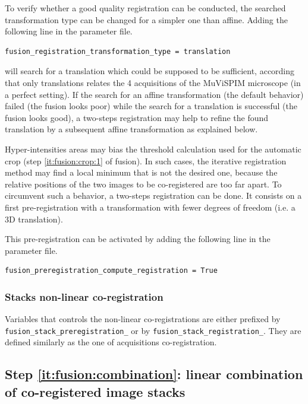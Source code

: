 To verify whether a good quality registration can be conducted, the searched transformation type can be changed for a simpler one than affine. 
Adding the following line in the parameter file.
\begin{verbatim}
fusion_registration_transformation_type = translation
\end{verbatim}
will search for a translation which could be supposed to be sufficient, according that only translations relates the 4 acquisitions of the MuViSPIM microscope (in a perfect setting). If the search for an affine transformation (the default behavior) failed (the fusion looks poor) while the search for a translation is successful (the fusion looks good), a two-steps registration may help to refine the found translation by a subsequent affine transformation as explained below.

Hyper-intensities areas may bias the threshold calculation used for the automatic crop (step \ref{it:fusion:crop:1} of fusion). In such cases, the iterative registration method may find a local minimum that is not the desired one, because the relative positions of the two images to be co-registered are too far apart. To circumvent such a behavior, a two-steps registration can be done. It consists on a first pre-registration with a transformation with fewer degrees of freedom (i.e. a 3D translation). 

This pre-registration can be activated by adding the following line in the parameter file.
\begin{verbatim}
fusion_preregistration_compute_registration = True
\end{verbatim}

\subsubsection{Stacks non-linear co-registration}
\label{sec:cli:fuse:stack:registration}
Variables that controls the non-linear co-registrations are either prefixed by \texttt{fusion\_stack\_preregistration\_} or by \texttt{fusion\_stack\_registration\_}. They are defined similarly as the one of acquisitions co-registration. 






\subsection{Step \ref{it:fusion:combination}: linear combination of co-registered image stacks}
\label{sec:cli:fuse:stack:fusion}

